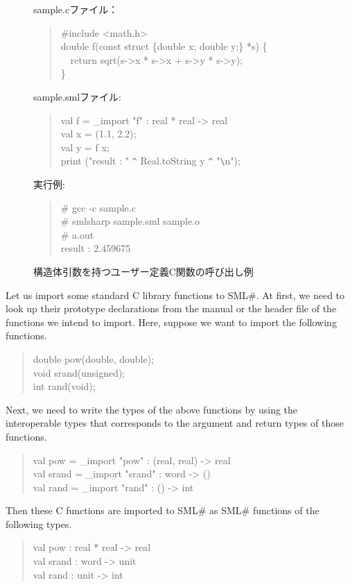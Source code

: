 \documentclass{jbook}
\newcommand{\smlsharp}{SML\#}
\newcommand{\myem}{\mbox{\ \ }}
\newenvironment{program}{\begin{quote}\begin{tt}}%
                        {\end{tt}\end{quote}}
\begin{document}
\begin{figure}
\begin{center}
\begin{minipage}{0.9\textwidth}
sample.cファイル：
\begin{program}
\#include <math.h>\\
double f(const struct \{double x; double y;\} *s) \{\\
\myem  return sqrt(s->x * s->x + s->y * s->y);\\
\}
\end{program}
sample.smlファイル:
\begin{program}
val f = \_import "f" : real * real -> real\\
val x = (1.1, 2.2);\\
val y = f x;\\
print ("result : " \verb|^| Real.toString y \verb|^| "\verb|\|n");\\
\end{program}
実行例:
\begin{program}
\# gcc -c sample.c\\
\# smlsharp sample.sml sample.o\\
\# a.out\\
result : 2.459675\\
\end{program}
\end{minipage}
\end{center}
\caption{構造体引数を持つユーザー定義C関数の呼び出し例}
\label{fig:sampleStruct}
\end{figure}

\else%

	Let us import some standard C library functions to \smlsharp{}.
	At first, we need to look up their prototype declarations
from the manual or the header file of the functions we intend to import.
	Here, suppose we want to import the following functions.
\begin{program}
double pow(double, double);\\
void srand(unsigned);\\
int rand(void);
\end{program}
	Next, we need to write the types of the above functions by using
the interoperable types that corresponds to the argument and return types
of those functions.
\begin{program}
val pow = \_import "pow" : (real, real) -> real\\
val srand = \_import "srand" : word -> ()\\
val rand = \_import "rand" : () -> int
\end{program}
	Then these C functions are imported to \smlsharp{} as \smlsharp{}
functions of the following types.
\begin{program}
val pow : real * real -> real\\
val srand : word -> unit\\
val rand : unit -> int
\end{program}
\end{document}
